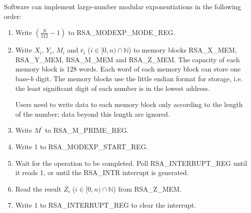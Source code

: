 \documentclass[main\_\_EN.tex]{subfiles}
\begin{document}
Software can implement large-number modular exponentiations in the following order:

\begin{enumerate}

    \item Write \begin{math}( \frac{N}{512} - 1 )\end{math} to RSA\_MODEXP\_MODE\_REG.

    \item Write
        \begin{math}X_{i}\end{math},
        \begin{math}Y_{i}\end{math},
        \begin{math}M_{i}\end{math} and
        \begin{math}\overline{r}_{i}\end{math}
        (\begin{math}i \in [0,n) \cap \mathbb{N}\end{math})
        to memory blocks RSA\_X\_MEM, RSA\_Y\_MEM, RSA\_M\_MEM and RSA\_Z\_MEM. The capacity of each memory block is 128 words. Each word of each memory block can store one base-\begin{math}b\end{math} digit. The memory blocks use the little endian format for storage, i.e. the least significant digit of each number is in the lowest address.
        
       Users need to write data to each memory block only according to the length of the number; data beyond this length are ignored.
        
    \item Write \begin{math}M^{\prime}\end{math} to RSA\_M\_PRIME\_REG.

    \item Write 1 to RSA\_MODEXP\_START\_REG.

    \item Wait for the operation to be completed. Poll RSA\_INTERRUPT\_REG until it reads 1, or until the RSA\_INTR interrupt is generated.
        
    \item Read the result \begin{math}Z_{i}\end{math}
        (\begin{math}i \in [0,n) \cap \mathbb{N}\end{math})
        from RSA\_Z\_MEM.

    \item Write 1 to RSA\_INTERRUPT\_REG to clear the interrupt.

\end{enumerate}
\end{document}
